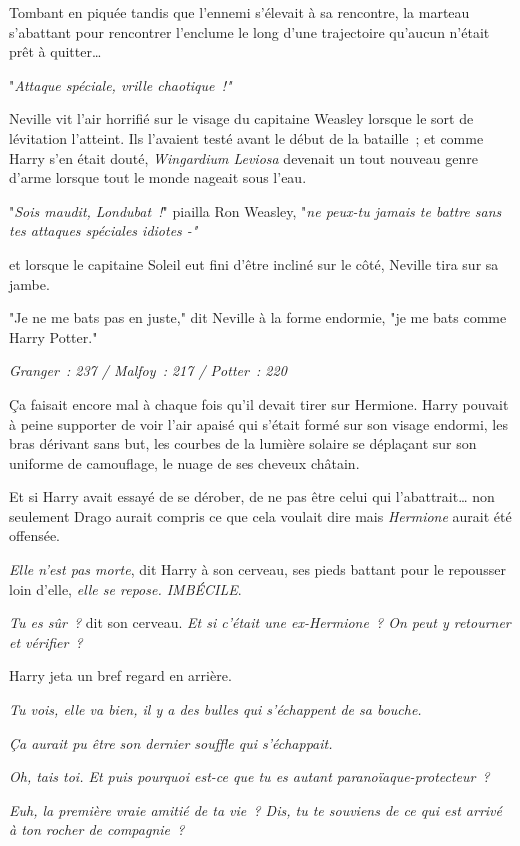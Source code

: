 Tombant en piquée tandis que l'ennemi s'élevait à sa rencontre, la marteau s'abattant pour rencontrer l'enclume le long d'une trajectoire qu'aucun n'était prêt à quitter…

"\emph{Attaque spéciale, vrille chaotique~!"}

Neville vit l'air horrifié sur le visage du capitaine Weasley lorsque le sort de lévitation l'atteint. Ils l'avaient testé avant le début de la bataille~; et comme Harry s'en était douté, \emph{Wingardium Leviosa} devenait un tout nouveau genre d'arme lorsque tout le monde nageait sous l'eau.

"\emph{Sois maudit, Londubat~!}" piailla Ron Weasley, "\emph{ne peux-tu jamais te battre sans tes attaques spéciales idiotes -"}

et lorsque le capitaine Soleil eut fini d'être incliné sur le côté, Neville tira sur sa jambe.

"Je ne me bats pas en juste," dit Neville à la forme endormie, "je me bats comme Harry Potter."

\emph{Granger~: 237 / Malfoy~: 217 / Potter~: 220}

\later

Ça faisait encore mal à chaque fois qu'il devait tirer sur Hermione. Harry pouvait à peine supporter de voir l'air apaisé qui s'était formé sur son visage endormi, les bras dérivant sans but, les courbes de la lumière solaire se déplaçant sur son uniforme de camouflage, le nuage de ses cheveux châtain.

Et si Harry avait essayé de se dérober, de ne pas être celui qui l'abattrait… non seulement Drago aurait compris ce que cela voulait dire mais \emph{Hermione} aurait été offensée.

\emph{Elle n'est pas morte}, dit Harry à son cerveau, ses pieds battant pour le repousser loin d'elle, \emph{elle se repose. IMBÉCILE}.

\emph{Tu es sûr~?} dit son cerveau. \emph{Et si c'était une ex-Hermione~? On peut y retourner et vérifier~?}

Harry jeta un bref regard en arrière.

\emph{Tu vois, elle va bien, il y a des bulles qui s'échappent de sa bouche.}

\emph{Ça aurait pu être son dernier souffle qui s'échappait.}

\emph{Oh, tais toi. Et puis pourquoi est-ce que tu es autant paranoïaque-protecteur~?}

\emph{Euh, la première vraie amitié de ta vie~? Dis, tu te souviens de ce qui est arrivé à ton rocher de compagnie~?}

